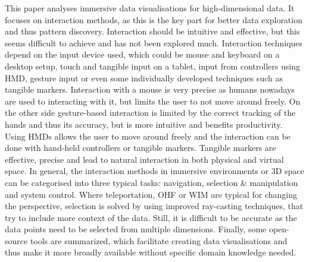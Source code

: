This paper analyses immersive data visualisations for high-dimensional data. It focuses on interaction methods, as this is the key part for better data exploration and thus pattern discovery. Interaction should be intuitive and effective, but this seems difficult to achieve and has not been explored much. Interaction techniques depend on the input device used, which could be mouse and keyboard on a desktop setup, touch and tangible input on a tablet, input from controllers using \ac{HMD}, gesture input or even some individually developed techniques such as tangible markers. Interaction with a mouse is very precise as humans nowadays are used to interacting with it, but limits the user to not move around freely. On the other side gesture-based interaction is limited by the correct tracking of the hands and thus its accuracy, but is more intuitive and benefits productivity. Using \ac{HMD}s allows the user to move around freely and the interaction can be done with hand-held controllers or tangible markers. Tangible markers are effective, precise and lead to natural interaction in both physical and virtual space. In general, the interaction methods in immersive environments or 3D space can be categorised into three typical tasks: navigation, selection \& manipulation and system control. Where teleportation, \ac{OHF} or \ac{WIM} are typical for changing the perspective, selection is solved by using improved ray-casting techniques, that try to include more context of the data. Still, it is difficult to be accurate as the data points need to be selected from multiple dimensions. Finally, some open-source tools are summarized, which facilitate creating data visualisations and thus make it more broadly available without specific domain knowledge needed.